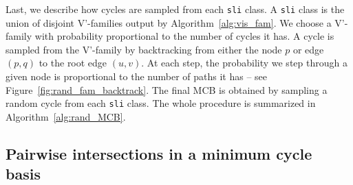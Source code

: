 \documentclass[fleqn,11pt]{article}
\newcommand\calM{\mathcal{M}}
\newcommand\calP{\mathcal{P}}     %
\begin{document}
Last, we describe how cycles are sampled from each {\tt sli} class. A {\tt sli} class is the union of disjoint V'-families output by Algorithm~\ref{alg:vis_fam}. 
We choose a V'-family with probability proportional to the number of cycles it has. 
A cycle is sampled from the V'-family by backtracking from either the node $p$ or edge $(p,q)$ to the root edge $(u,v)$. 
At each step, the probability we step through a given node is proportional to the number of paths it has -- see Figure~\ref{fig:rand_fam_backtrack}. The final MCB is obtained by sampling a random cycle from each {\tt sli} class. The whole procedure is summarized in Algorithm~\ref{alg:rand_MCB}.








\subsection{Pairwise intersections in a minimum cycle basis}
\label{sub:pair_intersect}
\end{document}
